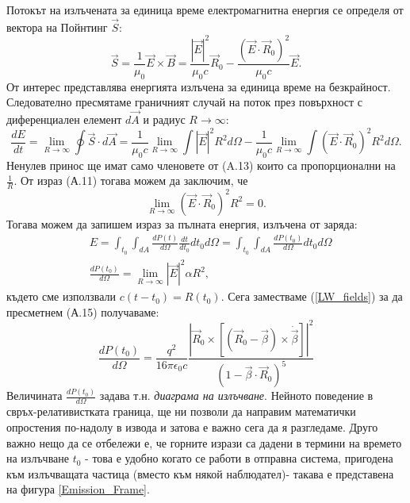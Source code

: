 \begin{appendices}
Потокът на излъчената за единица време електромагнитна енергия се определя от вектора на Пойнтинг $\vec{S}$:
\begin{equation}
	\vec{S} = \frac{1}{\mu_0}\vec{E}\times \vec{B} = \frac{|\vec{E}|^2}{\mu_0 c}\vec{R}_0 - \frac{(\vec{E}\cdot \vec{R}_0)^2}{\mu_0 c} \vec{E}.
\end{equation}
От интерес представлява енергията излъчена за единица време на безкрайност. Следователно пресмятаме граничният случай на поток през повърхност с диференциален елемент $d\vec{A}$ и радиус $R$$\rightarrow\infty$:
\begin{equation}
	\frac{dE}{dt} = \lim_{R\rightarrow\infty}\oint \vec{S}\cdot d\vec{A} = \frac{1}{\mu_0 c}\lim_{R\rightarrow\infty}\int|\vec{E}|^2 R^2 d\Omega - \frac{1}{\mu_0 c}\lim_{R\rightarrow\infty}\int (\vec{E}\cdot\vec{R}_0)^2 R^2d\Omega.
\end{equation}
Ненулев принос ще имат само членовете от (A.13) които са пропорционални на $\frac{1}{R}$. От израз (А.11) тогава можем да заключим, че 
\begin{equation}
	\lim_{R\rightarrow\infty}(\vec{E}\cdot\vec{R}_0)^2 R^2 = 0.
\end{equation}
Тогава можем да запишем израз за пълната енергия, излъчена от заряда:
\begin{equation}
	\begin{split}
	&E = \int_{t_0}\int_{dA}\frac{dP(t)}{d\Omega}\frac{dt}{dt_0}dt_0d\Omega = \int_{t_0}\int_{dA}\frac{dP(t_0)}{d\Omega}dt_0d\Omega\\
	&\frac{dP(t_0)}{d\Omega} = \lim_{R\rightarrow\infty}|\vec{E}|^2 \alpha R^2,
	\end{split}
\end{equation}
където сме използвали $c(t - t_0) = R(t_0)$. Сега заместваме (\ref{LW_fields}) за да пресметнем (А.15) получаваме:
\begin{equation}
	\frac{dP(t_0)}{d\Omega} = \frac{q^2}{16\pi\epsilon_0 c}\frac{\left\vert\vec{R}_0 \times \left[\left(\vec{R}_0 - \vec{\beta}\right)\times\dot{\vec{\beta}}\right]\right\vert^2}{(1 - \vec{\beta}\cdot\vec{R}_0)^5}
\end{equation}
Величината $\frac{dP(t_0)}{d\Omega}$ задава т.н. \emph{диаграма на излъчване}. Нейното поведение в свръх-релативистката граница, ще ни позволи да направим математички опростения по-надолу в извода и затова е важно сега да я разгледаме.
Друго важно нещо да се отбележи е, че горните изрази са дадени в термини на времето на излъчване $t_0$ - това е удобно когато се работи в отправна система, пригодена към излъчващата частица (вместо към някой наблюдател)- такава е представена на  фигура \ref{Emission_Frame}. \\


\end{appendices}
